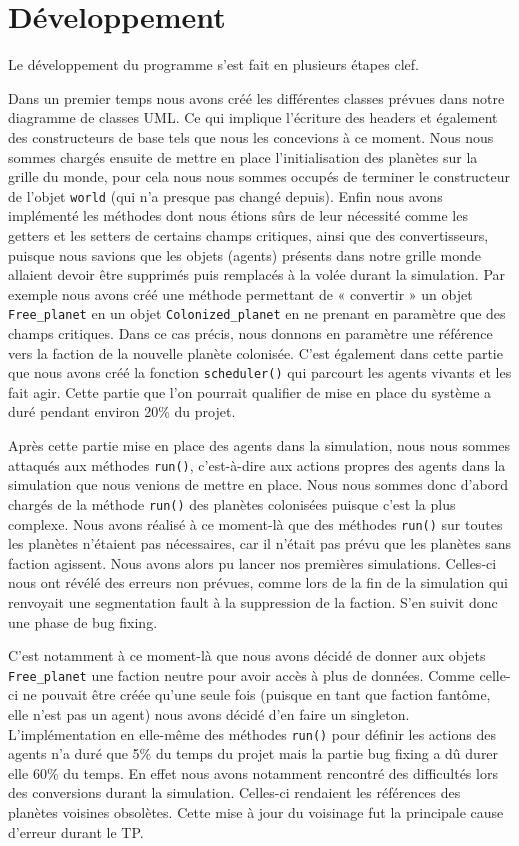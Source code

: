 \chapter{Développement}

  Le développement du programme s’est fait en plusieurs étapes clef.

  Dans un premier temps nous avons créé les différentes classes prévues dans notre diagramme de classes UML. Ce qui implique l’écriture des headers et également des constructeurs de base tels que nous les concevions à ce moment. Nous nous sommes chargés ensuite de mettre en place l’initialisation des planètes sur la grille du monde, pour cela nous nous sommes occupés de terminer le constructeur de l’objet \texttt{world} (qui n’a presque pas changé depuis). Enfin nous avons implémenté les méthodes dont nous étions sûrs de leur nécessité comme les getters et les setters de certains champs critiques, ainsi que des convertisseurs, puisque nous savions que les objets (agents) présents dans notre grille monde allaient devoir être supprimés puis remplacés à la volée durant la simulation. Par exemple nous avons créé une méthode permettant de « convertir » un objet \texttt{Free\_planet} en un objet \texttt{Colonized\_planet} en ne prenant en paramètre que des champs critiques. Dans ce cas précis, nous donnons en paramètre une référence vers la faction de la nouvelle planète colonisée. C’est également dans cette partie que nous avons créé la fonction \texttt{scheduler()} qui parcourt les agents vivants et les fait agir. Cette partie que l’on pourrait qualifier de mise en place du système a duré pendant environ 20\% du projet.

  Après cette partie mise en place des agents dans la simulation, nous nous sommes attaqués aux méthodes \texttt{run()}, c’est-à-dire aux actions propres des agents dans la simulation que nous venions de mettre en place. Nous nous sommes donc d’abord chargés de la méthode \texttt{run()} des planètes colonisées puisque c’est la plus complexe. Nous avons réalisé à ce moment-là que des méthodes \texttt{run()} sur toutes les planètes n’étaient pas nécessaires, car il n’était pas prévu que les planètes sans faction agissent. Nous avons alors pu lancer nos premières simulations. Celles-ci nous ont révélé des erreurs non prévues, comme lors de la fin de la simulation qui renvoyait une segmentation fault à la suppression de la faction. S’en suivit donc une phase de bug fixing.

  C’est notamment à ce moment-là que nous avons décidé de donner aux objets \texttt{Free\_planet} une faction neutre pour avoir accès à plus de données. Comme celle-ci ne pouvait être créée qu’une seule fois (puisque en tant que faction fantôme, elle n’est pas un agent) nous avons décidé d’en faire un singleton. L’implémentation en elle-même des méthodes \texttt{run()} pour définir les actions des agents n’a duré que 5\% du temps du projet mais la partie bug fixing a dû durer elle 60\% du temps. En effet nous avons notamment rencontré des difficultés lors des conversions durant la simulation. Celles-ci rendaient les références des planètes voisines obsolètes. Cette mise à jour du voisinage fut la principale cause d’erreur durant le TP.


